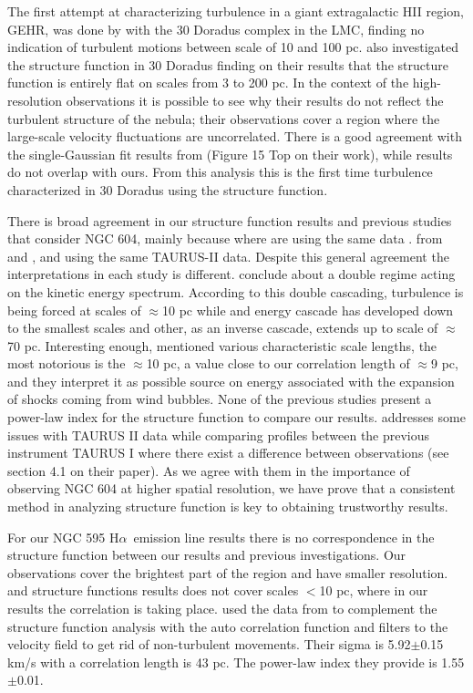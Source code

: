 \documentclass[fleqn,usenatbib, useAMS, a4paper]{mnras}
\newcommand\halpha{H${\alpha}$}
\begin{document}
The first attempt at characterizing turbulence in a giant extragalactic HII region, GEHR, was done by \citet{1961MNRAS.122....1F} with the 30 Doradus complex in the LMC, finding no indication of turbulent motions between scale of 10 and 100 pc.
\citet{2019arXiv191203543M} also investigated the structure function in 30 Doradus finding on their results that the structure function is entirely flat on scales from 3 to 200 pc.
In the context of the high-resolution observations it is possible to see why their results do not reflect the turbulent structure of the nebula; their observations cover a region where the large-scale velocity fluctuations are uncorrelated.
There is a good agreement with the single-Gaussian fit results from \citet{2019arXiv191203543M} (Figure 15 Top on their work), while \citet{1961MNRAS.122....1F} results do not overlap with ours.
From this analysis this is the first time turbulence characterized in 30 Doradus using the structure function.

There is broad agreement in our structure function results and previous studies that consider NGC 604, mainly because where are using the same data \citep{tanco1997,2019arXiv191203543M}. 
from \citet{tanco1997} and \citet{2019arXiv191203543M}, and using the same TAURUS-II data.
Despite this general agreement the interpretations in each study is different.
\citet{tanco1997} conclude about a double regime acting on the kinetic energy spectrum.
According to this double cascading, turbulence is being forced at scales of \(\approx\)10 pc while and energy cascade has developed down to the smallest scales and other, as an inverse cascade, extends up to scale of \(\approx\)70 pc.
Interesting enough, \citet{tanco1997} mentioned various characteristic scale lengths, the most notorious is the \(\approx\)10 pc, a value close to our correlation length of \(\approx\)9 pc, and they interpret it as possible source on energy associated with the expansion of shocks coming from wind bubbles.  
None of the previous studies present a power-law index for the structure function to compare our results.
\citet{2019arXiv191203543M} addresses some issues with TAURUS II data while comparing profiles between the previous instrument TAURUS I where there exist a difference between observations (see section 4.1 on their paper).
As we agree with them in the importance of observing NGC 604 at higher spatial resolution, we have prove that a consistent method in analyzing structure function is key to obtaining trustworthy results.

For our NGC 595 \halpha\ emission line results there is no correspondence in the structure function between our results and previous investigations.
Our observations cover the brightest part of the region and have smaller resolution.
\citet{lagrois2009multi} and \citet{lagrois2011} structure functions results does not cover scales $<$10 pc, where in our results the correlation is taking place.
\citet{lagrois2011} used the data from \citet{lagrois2009multi} to complement the structure function analysis with the auto correlation function and filters to the velocity field to get rid of non-turbulent movements.
Their sigma is 5.92$\pm$0.15 km/s with a correlation length is 43 pc.
The power-law index they provide is 1.55$\pm$0.01.
\end{document}
